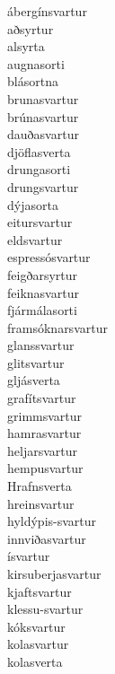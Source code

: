 \documentclass[../samsetningasafn.tex]{subfiles}
\begin{document}
\begin{bigwordlist}
\begin{footnotesize}
\begin{multicols}{4}
	\begin{description}
		\item [ábergínsvartur]
		\item [aðsyrtur]
		\item [alsyrta]
		\item [augnasorti]
		\item [blásortna]
		\item [brunasvartur]
		\item [brúnasvartur]
		\item [dauðasvartur]
		\item [djöflasverta]
		\item [drungasorti]
		\item [drungsvartur]
		\item [dýjasorta]
		\item [eitursvartur]
		\item [eldsvartur]
		\item [espressósvartur]
		\item [feigðarsyrtur]
		\item [feiknasvartur]
		\item [fjármálasorti]
		\item [framsóknarsvartur]
		\item [glanssvartur]
		\item [glitsvartur]
		\item [gljásverta]
		\item [grafítsvartur]
		\item [grimmsvartur]
		\item [hamrasvartur]
		\item [heljarsvartur]
		\item [hempusvartur]
		\item [Hrafnsverta]
		\item [hreinsvartur]
		\item [hyldýpis-svartur]
		\item [innviðasvartur]
		\item [ísvartur]
		\item [kirsuberjasvartur]
		\item [kjaftsvartur]
		\item [klessu-svartur]
		\item [kóksvartur]
		\item [kolasvartur]
		\item [kolasverta]

\end{description}
\end{multicols}
\end{footnotesize}
\end{bigwordlist}
\end{document}
